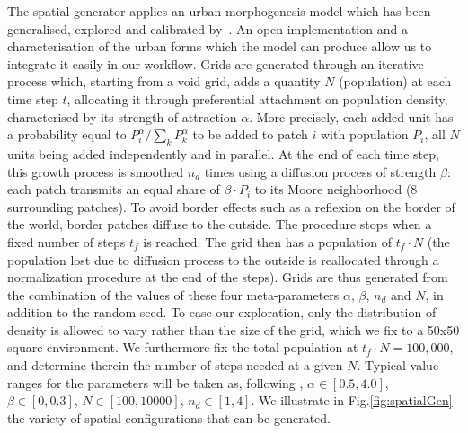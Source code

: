 \documentclass[3p,times,procedia]{elsarticle}
\begin{document}
The spatial generator applies an urban morphogenesis model \citep{Batty2007} which has been generalised, explored and calibrated by~\citet{2017arXiv170806743R}. An open implementation and a characterisation of the urban forms which the model can produce  allow us to integrate it easily in our workflow. Grids are generated through an iterative process which, starting from a void grid, adds a quantity $N$ (population) at each time step $t$, allocating it through preferential attachment on population density, characterised by its strength of attraction $\alpha$. More precisely, each added unit has a probability equal to $P_i^{\alpha}/\sum_k P_k^{\alpha}$ to be added to  patch $i$ with population $P_i$, all $N$ units being added independently and in parallel. At the end of each time step, this growth process is smoothed $n_d$ times using a diffusion process of strength $\beta$: each patch transmits an equal share of $\beta\cdot P_i$ to its Moore neighborhood (8 surrounding patches). To avoid border effects such as a reflexion on the border of the world, border patches diffuse to the outside. The procedure stops when a fixed number of steps $t_f$ is reached. The grid then has a population of $t_f \cdot N$ (the population lost due to diffusion process to the outside is reallocated through a normalization procedure at the end of the steps). Grids are thus generated from the combination of the values of these four meta-parameters $\alpha$, $\beta$, $n_d$ and $N$, in addition to the random seed. To ease our exploration, only the distribution of density is allowed to vary rather than the size of the grid, which we fix to a 50x50 square environment. We furthermore fix the total population at $t_f\cdot N = 100,000$, and determine therein the number of steps needed at a given $N$. Typical value ranges for the  parameters will be taken as, following \citet{2017arXiv170806743R}, $\alpha\in\left[0.5,4.0\right]$, $\beta \in\left[0,0.3\right] $, $N\in \left[100,10000\right]$, $n_d\in\left[1,4\right]$. We illustrate in Fig.\ref{fig:spatialGen} the variety of spatial configurations that can be generated.
\end{document}
